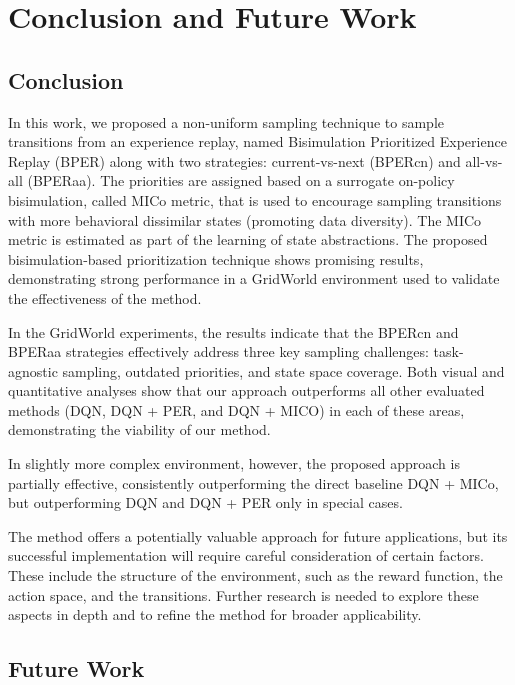 
\chapter{Conclusion and Future Work}
\label{sec:conclusion_future_work}

\section{Conclusion}
In this work, we proposed a non-uniform sampling technique to sample transitions from an experience replay, named Bisimulation Prioritized Experience Replay (BPER) along with two strategies: current-vs-next (BPERcn) and all-vs-all (BPERaa). The priorities are assigned based on a surrogate on-policy bisimulation, called MICo metric, that is used to encourage sampling transitions with more behavioral dissimilar states (promoting data diversity). The MICo metric is estimated as part of the learning of state abstractions. The proposed bisimulation-based prioritization technique shows promising results, demonstrating strong performance in a GridWorld environment used to validate the effectiveness of the method.

In the GridWorld experiments, the results indicate that the BPERcn and BPERaa strategies effectively address three key sampling challenges: task-agnostic sampling, outdated priorities, and state space coverage. Both visual and quantitative analyses show that our approach outperforms all other evaluated methods (DQN, DQN + PER, and DQN + MICO) in each of these areas, demonstrating the viability of our method.

In slightly more complex environment, however, the proposed approach is partially effective, consistently outperforming the direct baseline DQN + MICo, but outperforming DQN and DQN + PER only in special cases.

The method offers a potentially valuable approach for future applications, but its successful implementation will require careful consideration of certain factors. These include the structure of the environment, such as the reward function, the action space, and the transitions. Further research is needed to explore these aspects in depth and to refine the method for broader applicability.

\section{Future Work}

